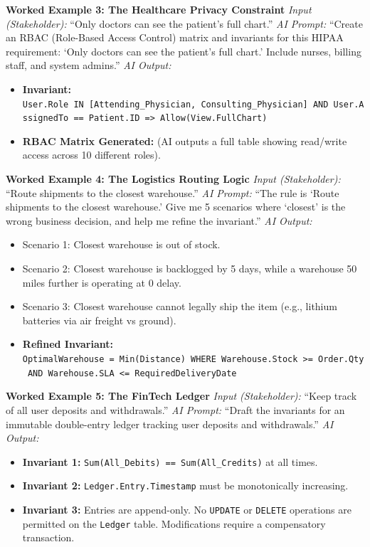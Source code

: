 \textbf{Worked Example 3: The Healthcare Privacy Constraint} \emph{Input
(Stakeholder):} ``Only doctors can see the patient's full chart.''
\emph{AI Prompt:} ``Create an RBAC (Role-Based Access Control) matrix
and invariants for this HIPAA requirement: `Only doctors can see the
patient's full chart.' Include nurses, billing staff, and system
admins.'' \emph{AI Output:}

\begin{itemize}
\tightlist
\item
  \textbf{Invariant:}
  \texttt{User.Role\ IN\ {[}Attending\_Physician,\ Consulting\_Physician{]}\ AND\ User.AssignedTo\ ==\ Patient.ID\ =\textgreater{}\ Allow(View.FullChart)}
\item
  \textbf{RBAC Matrix Generated:} (AI outputs a full table showing
  read/write access across 10 different roles).
\end{itemize}

\textbf{Worked Example 4: The Logistics Routing Logic} \emph{Input
(Stakeholder):} ``Route shipments to the closest warehouse.'' \emph{AI
Prompt:} ``The rule is `Route shipments to the closest warehouse.' Give
me 5 scenarios where `closest' is the wrong business decision, and help
me refine the invariant.'' \emph{AI Output:}

\begin{itemize}
\tightlist
\item
  Scenario 1: Closest warehouse is out of stock.
\item
  Scenario 2: Closest warehouse is backlogged by 5 days, while a
  warehouse 50 miles further is operating at 0 delay.
\item
  Scenario 3: Closest warehouse cannot legally ship the item (e.g.,
  lithium batteries via air freight vs ground).
\item
  \textbf{Refined Invariant:}
  \texttt{OptimalWarehouse\ =\ Min(Distance)\ WHERE\ Warehouse.Stock\ \textgreater{}=\ Order.Qty\ AND\ Warehouse.SLA\ \textless{}=\ RequiredDeliveryDate}
\end{itemize}

\textbf{Worked Example 5: The FinTech Ledger} \emph{Input
(Stakeholder):} ``Keep track of all user deposits and withdrawals.''
\emph{AI Prompt:} ``Draft the invariants for an immutable double-entry
ledger tracking user deposits and withdrawals.'' \emph{AI Output:}

\begin{itemize}
\tightlist
\item
  \textbf{Invariant 1:} \texttt{Sum(All\_Debits)\ ==\ Sum(All\_Credits)}
  at all times.
\item
  \textbf{Invariant 2:} \texttt{Ledger.Entry.Timestamp} must be
  monotonically increasing.
\item
  \textbf{Invariant 3:} Entries are append-only. No \texttt{UPDATE} or
  \texttt{DELETE} operations are permitted on the \texttt{Ledger} table.
  Modifications require a compensatory transaction.
\end{itemize}

